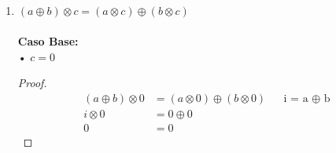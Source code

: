 \documentclass[11pt,letterpaper]{article}
\begin{document}
\begin{enumerate}
\vspace{0.1cm}

\noindent \textbf{\large Caso Inductivo:}\\
\noindent • $c=\sigma(c)$ \\
\noindent • \textbf{Hipótesis Inductiva: } $a \otimes (b \otimes c)=(a\otimes b)\otimes c$ \\
\noindent • \emph{Demostrar que:} $a \otimes (b \otimes \sigma(c))=(a \otimes b)\otimes \sigma(c)$

\begin{proof}
\begin{align}
a \otimes (b \otimes \sigma(c))&=(a \otimes b)\otimes \sigma(c) && \text{Definición de la multiplicación.} \\
a \otimes (b \otimes \sigma(c))&=((a \otimes b)\otimes c) \oplus (a \otimes b) && \text{Por hipotesis inductiva.} \\
a \otimes (b \otimes \sigma(c))&= (a \otimes (b \otimes c)) \oplus (a \otimes b) && \text{La suma es conmutativa.} \\
a \otimes (b \otimes \sigma(c))&= (a \otimes b) \oplus (a \otimes (b \otimes c)) && \text{La multiplicación es distributiva.} \\
a \otimes (b \otimes \sigma(c))&= a \otimes (b \oplus (b \otimes c)) && \text{La suma es conmutativa.} \\
a \otimes (b \otimes \sigma(c))&= a \otimes ((b \otimes c) \oplus b) && \text{Definición de la multiplicación.}\\
a \otimes (b \otimes \sigma(c))&= a \otimes (b \otimes \sigma(c))
\end{align}
\end{proof}


\item{$(a\oplus b)\otimes c = (a\otimes c) \oplus (b \otimes c)$} \\
\\
\noindent \textbf{\large Caso Base:}\\
\noindent • $c=0$
\begin{proof}
\begin{align*}
(a \oplus b) \otimes 0 &= (a \otimes 0) \oplus (b \otimes 0) && \text{i\ =\ a\ $\oplus$\ b} \\
i \otimes 0 &= 0 \oplus 0 \\
0 &= 0
\end{align*}
\end{proof}


\end{enumerate}
\end{document}
